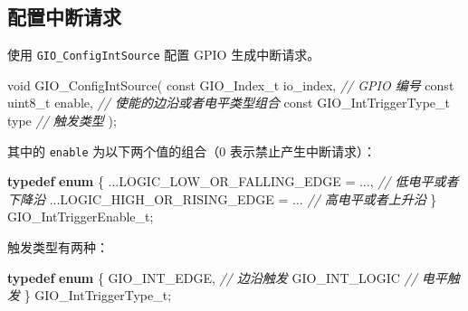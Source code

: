 \documentclass[
  12pt,
]{book}
\newenvironment{Shaded}{\begin{snugshade}}{\end{snugshade}}
\newcommand{\CommentTok}[1]{\textcolor[rgb]{0.56,0.35,0.01}{\textit{#1}}}
\newcommand{\DataTypeTok}[1]{\textcolor[rgb]{0.13,0.29,0.53}{#1}}
\newcommand{\KeywordTok}[1]{\textcolor[rgb]{0.13,0.29,0.53}{\textbf{#1}}}
\newcommand{\NormalTok}[1]{#1}
\begin{document}
\hypertarget{ux914dux7f6eux4e2dux65adux8bf7ux6c42}{%
\subsection{配置中断请求}\label{ux914dux7f6eux4e2dux65adux8bf7ux6c42}}

使用 \texttt{GIO\_ConfigIntSource} 配置 GPIO 生成中断请求。

\begin{Shaded}
\begin{Highlighting}[]
\DataTypeTok{void}\NormalTok{ GIO_ConfigIntSource(}
  \DataTypeTok{const}\NormalTok{ GIO_Index_t io_index,     }\CommentTok{// GPIO 编号}
  \DataTypeTok{const} \DataTypeTok{uint8_t}\NormalTok{ enable,           }\CommentTok{// 使能的边沿或者电平类型组合}
  \DataTypeTok{const}\NormalTok{ GIO_IntTriggerType_t type }\CommentTok{// 触发类型}
\NormalTok{  );}
\end{Highlighting}
\end{Shaded}

其中的 \texttt{enable} 为以下两个值的组合（0 表示禁止产生中断请求）：

\begin{Shaded}
\begin{Highlighting}[]
\KeywordTok{typedef} \KeywordTok{enum}
\NormalTok{\{}
\NormalTok{    ...LOGIC_LOW_OR_FALLING_EDGE = ..., }\CommentTok{// 低电平或者下降沿}
\NormalTok{    ...LOGIC_HIGH_OR_RISING_EDGE = ...  }\CommentTok{// 高电平或者上升沿}
\NormalTok{\} GIO_IntTriggerEnable_t;}
\end{Highlighting}
\end{Shaded}

触发类型有两种：

\begin{Shaded}
\begin{Highlighting}[]
\KeywordTok{typedef} \KeywordTok{enum}
\NormalTok{\{}
\NormalTok{    GIO_INT_EDGE,   }\CommentTok{// 边沿触发}
\NormalTok{    GIO_INT_LOGIC   }\CommentTok{// 电平触发}
\NormalTok{\} GIO_IntTriggerType_t;}
\end{Highlighting}
\end{Shaded}
\end{document}
